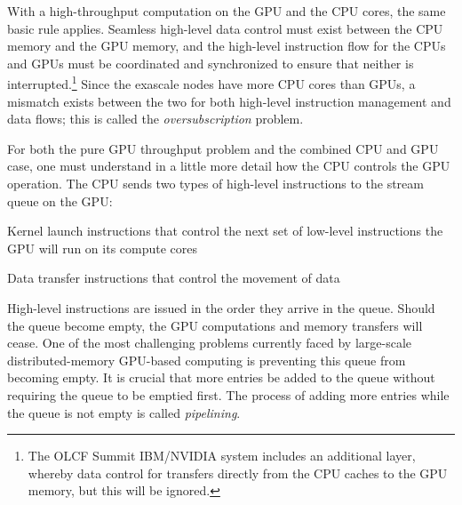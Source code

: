 \documentclass[5p,times]{elsarticle}
\newenvironment{titemize} %
        {\begin{list}{\labelitemi}{
                \setlength{\topsep}{0pt}
                \setlength{\parskip}{0pt}
                \setlength{\itemsep}{0pt}
                \setlength{\parsep}{0pt}
                \setlength{\leftmargin}{23pt}
                \setlength{\labelwidth}{23pt}
        }}
        {\end{list}}
\begin{document}
With a high-throughput computation on the GPU and the CPU  cores, the same basic rule applies.  Seamless high-level
data control must exist between the CPU memory and the GPU memory, and the high-level instruction flow for the CPUs and GPUs must be coordinated and synchronized to ensure that neither is
interrupted.\footnote{The OLCF Summit IBM/NVIDIA system includes an additional layer, whereby data control for transfers directly from the CPU caches to the GPU memory, but this will be
ignored.} Since the exascale nodes have more CPU cores than GPUs,  a mismatch exists between the two for both high-level instruction management and data flows; this
is called the \emph{oversubscription} problem.

For both the pure GPU throughput problem and the combined CPU and GPU case, one must understand in a little more detail  how the CPU controls the GPU operation. %
The CPU sends two types of high-level instructions to the stream queue on the GPU:
\begin{titemize}
 \item Kernel launch instructions that control the next set of low-level instructions the GPU will run on its compute cores
 \item Data transfer instructions that control the movement of data
\end{titemize}
High-level instructions are issued in the order they arrive in the queue.
Should the queue become empty, the GPU computations and memory transfers will cease. One of the most challenging problems currently faced by large-scale distributed-memory GPU-based computing is preventing this queue from
becoming empty. It is crucial that more entries be added to the queue without requiring the queue to be emptied first. The process of adding more entries while the queue
is not empty is called \emph{pipelining}.  
\end{document}
